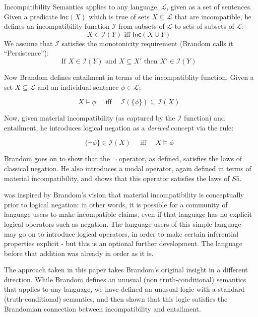 Incompatibility Semantics applies to any language, $\mathcal{L}$,
given as a set of sentences.  Given a predicate $\mathsf{Inc}(X)$
which is true of sets $X \subseteq \mathcal{L}$ that are incompatible,
he defines an incompatibility function $\mathcal{I}$ from subsets of
$\mathcal{L}$ to sets of subsets of $\mathcal{L}$:
\[
X \in \mathcal{I}(Y) \text{ iff } \mathsf{Inc}(X \cup Y)
\]
We assume that $\mathcal{I}$ satisfies the
monotonicity requirement (Brandom calls it ``Persistence''):
\[
   \text{If } X \in \mathcal{I}(Y) \text{ and } X \subseteq X' \text{ then } X' \in \mathcal{I}(Y)
\]

\NI Now Brandom defines entailment in terms of the incompatiblity
function. Given a set $X \subseteq \mathcal{L}$ and an individual
sentence $\phi \in \mathcal{L}$:

\[
   X \models \phi\quad \text{ iff }\quad \mathcal{I}(\{\phi\}) \subseteq \mathcal{I}(X)
\]

\NI Now, given material incompatibility (as captured by the
$\mathcal{I}$ function) and entailment, he introduces logical negation
as a \emph{derived} concept via the rule:

\[
   \{\neg \phi\} \in \mathcal{I}(X)\quad \text{ iff }\quad X \models \phi
\]

\NI Brandom goes on to show that the $\neg$ operator, as defined, satisfies
the laws of classical negation.  He also introduces a modal operator,
again defined in terms of material incompatibility, and shows that
this operator satisfies the laws of $S5$.

\Cathoristic{} was inspired by Brandom's vision that material
incompatibility is conceptually prior to logical negation: in other
words, it is possible for a community of language users to make incompatible claims, even if that
language has no explicit logical operators such as negation.  The
language users of this simple language may go on to introduce logical
operators, in order to make certain inferential properties explicit -
but this is an optional further development.  The language before that
addition was already in order as it is.

The approach taken in this paper takes Brandom's original insight in a
different direction.  While Brandom defines an unusual (non
truth-conditional) semantics that applies to any language, we have
defined an unusual logic with a standard (truth-conditional) semantics, and then shown that this logic satisfies the Brandomian connection between incompatibility and entailment.

